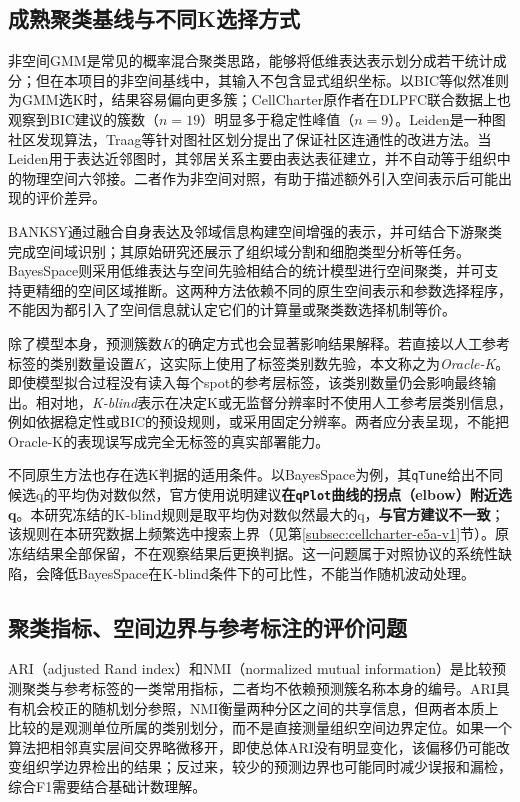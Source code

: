 \subsection{成熟聚类基线与不同K选择方式}
\label{subsec:cc-baselines-background-v1}

非空间GMM是常见的概率混合聚类思路，能够将低维表达表示划分成若干统计成分；但在本项目的非空间基线中，其输入不包含显式组织坐标。以BIC等似然准则为GMM选K时，结果容易偏向更多簇；CellCharter原作者在DLPFC联合数据上也观察到BIC建议的簇数（$n=19$）明显多于稳定性峰值（$n=9$）\cite{varrone2024}。Leiden是一种图社区发现算法，Traag等针对图社区划分提出了保证社区连通性的改进方法\cite{traag2019}。当Leiden用于表达近邻图时，其邻居关系主要由表达表征建立，并不自动等于组织中的物理空间六邻接。二者作为非空间对照，有助于描述额外引入空间表示后可能出现的评价差异。

BANKSY通过融合自身表达及邻域信息构建空间增强的表示，并可结合下游聚类完成空间域识别；其原始研究还展示了组织域分割和细胞类型分析等任务\cite{singhal2024}。BayesSpace则采用低维表达与空间先验相结合的统计模型进行空间聚类，并可支持更精细的空间区域推断\cite{zhao2021}。这两种方法依赖不同的原生空间表示和参数选择程序，不能因为都引入了空间信息就认定它们的计算量或聚类数选择机制等价。

除了模型本身，预测簇数$K$的确定方式也会显著影响结果解释。若直接以人工参考标签的类别数量设置$K$，这实际上使用了标签类别数先验，本文称之为\textit{Oracle-K}。即使模型拟合过程没有读入每个spot的参考层标签，该类别数量仍会影响最终输出。相对地，\textit{K-blind}表示在决定K或无监督分辨率时不使用人工参考层类别信息，例如依据稳定性或BIC的预设规则，或采用固定分辨率。两者应分表呈现，不能把Oracle-K的表现误写成完全无标签的真实部署能力。

不同原生方法也存在选K判据的适用条件。以BayesSpace为例，其\texttt{qTune}给出不同候选q的平均伪对数似然，官方使用说明建议\textbf{在\texttt{qPlot}曲线的拐点（elbow）附近选q}\cite{bayesspacevignette}。本研究冻结的K-blind规则是取平均伪对数似然最大的q，\textbf{与官方建议不一致}；该规则在本研究数据上频繁选中搜索上界（见第\ref{subsec:cellcharter-e5a-v1}节）。原冻结结果全部保留，不在观察结果后更换判据。这一问题属于对照协议的系统性缺陷，会降低BayesSpace在K-blind条件下的可比性，不能当作随机波动处理。

\subsection{聚类指标、空间边界与参考标注的评价问题}
\label{subsec:cc-evaluation-background-v1}

ARI（adjusted Rand index）和NMI（normalized mutual information）是比较预测聚类与参考标签的一类常用指标，二者均不依赖预测簇名称本身的编号。ARI具有机会校正的随机划分参照，NMI衡量两种分区之间的共享信息，但两者本质上比较的是观测单位所属的类别划分，而不是直接测量组织空间边界定位。如果一个算法把相邻真实层间交界略微移开，即使总体ARI没有明显变化，该偏移仍可能改变组织学边界检出的结果；反过来，较少的预测边界也可能同时减少误报和漏检，综合F1需要结合基础计数理解。


